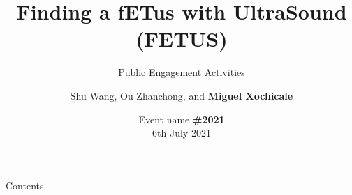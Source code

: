 \documentclass[xcolor={dvipsnames},aspectratio=169,10pt]{beamer}
\title{Finding a fETus with UltraSound (FETUS)}
\subtitle{Public Engagement Activities}
\author{
Shu Wang,
Ou Zhanchong, and
{\bf Miguel Xochicale}
}
\date{
Event name {\bf \#2021} \\
6th July 2021
}
\institute{
	\faEnvelope e-mail@server.com \\
	\faGithubAlt @githubhandler \faTwitter @twitterhandler
		}
\begin{document}
\maketitle

\begin{frame}{Contents}
    \tableofcontents
\end{frame}








\maketitle
\end{document}

